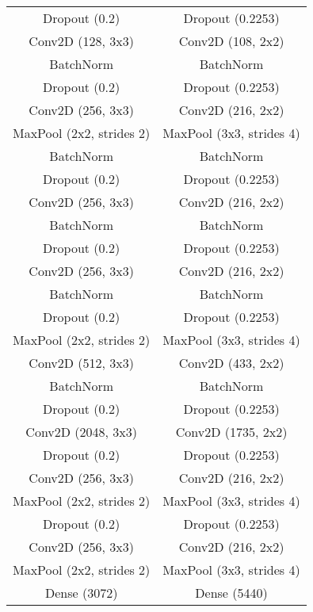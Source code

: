 \documentclass[
12pt,       %
openright,      %
oneside,      %
a4paper,      %
english,      %
french,       %
spanish,      %
brazil        %
]{abntex2}
\begin{document}
\begin{table}[H]
\begin{tabular}{@{}cc@{}}
Dropout (0.2)                & Dropout (0.2253)               \\
Conv2D (128, 3x3)                 & Conv2D (108, 2x2)                   \\
BatchNorm                    & BatchNorm                      \\
Dropout (0.2)                & Dropout (0.2253)               \\
Conv2D (256, 3x3)                 & Conv2D (216, 2x2)                   \\
MaxPool (2x2, strides 2)     & MaxPool (3x3, strides 4)       \\
BatchNorm                    & BatchNorm                      \\
Dropout (0.2)                & Dropout (0.2253)               \\
Conv2D (256, 3x3)                 & Conv2D (216, 2x2)                   \\
BatchNorm                    & BatchNorm                      \\
Dropout (0.2)                & Dropout (0.2253)               \\
Conv2D (256, 3x3)                 & Conv2D (216, 2x2)                   \\
BatchNorm                    & BatchNorm                      \\
Dropout (0.2)                & Dropout (0.2253)               \\
MaxPool (2x2, strides 2)     & MaxPool (3x3, strides 4)       \\
Conv2D (512, 3x3)                 & Conv2D (433, 2x2)                   \\
BatchNorm                    & BatchNorm                      \\
Dropout (0.2)                & Dropout (0.2253)               \\
Conv2D (2048, 3x3)                & Conv2D (1735, 2x2)                  \\
Dropout (0.2)                & Dropout (0.2253)               \\
Conv2D (256, 3x3)                 & Conv2D (216, 2x2)                   \\
MaxPool (2x2, strides 2)     & MaxPool (3x3, strides 4)       \\
Dropout (0.2)                & Dropout (0.2253)               \\
Conv2D (256, 3x3)                 & Conv2D (216, 2x2)                   \\
MaxPool (2x2, strides 2)     & MaxPool (3x3, strides 4)       \\ 
Dense (3072)                 & Dense (5440)                   \\ \hline
\end{tabular}
\end{table}
\end{document}
